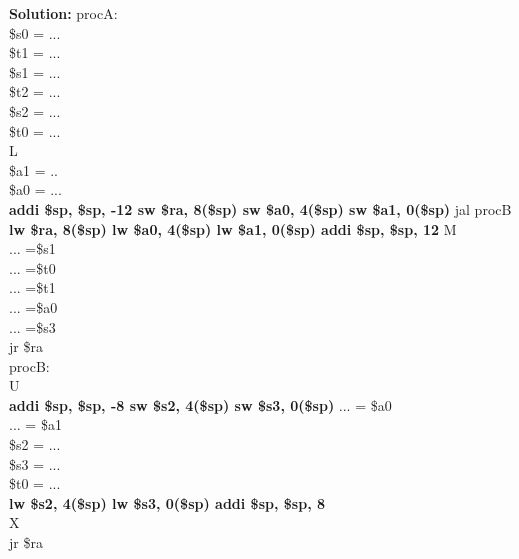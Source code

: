 \documentclass[11pt]{article}
\begin{document}
\textbf{Solution:} procA: \\
    \$s0 = ... \\
    \$t1 = ... \\
    \$s1 = ... \\
    \$t2 = ... \\
    \$s2 = ... \\
    \$t0 = ... \\
    L \\
    \$a1 = .. \\
    \$a0 = ... \\   
    \textbf{
    addi \$sp, \$sp, -12 \newline
    sw \$ra, 8(\$sp) \newline 
    sw \$a0, 4(\$sp) \newline 
    sw \$a1, 0(\$sp) \newline
    }
    jal procB \newline 
    \textbf{
    lw \$ra, 8(\$sp) \newline
    lw \$a0, 4(\$sp)\newline
    lw \$a1, 0(\$sp)\newline
    addi \$sp, \$sp, 12\newline
    }
    M \\
    ... =\$s1 \\
    ... =\$t0 \\
    ... =\$t1 \\
    ... =\$a0 \\
    ... =\$s3 \\
     jr \$ra \\
     \newline 
     procB: \\ 
    U \\
    \textbf{
    addi \$sp, \$sp, -8 \newline
    sw \$s2, 4(\$sp)\newline
    sw \$s3, 0(\$sp)\newline
    }
    ... = \$a0 \\
    ... = \$a1 \\
    \$s2 = ...\\
    \$s3 = ...\\
    \$t0 = ...\\
    \textbf{
    lw \$s2, 4(\$sp)\newline
    lw \$s3, 0(\$sp)\newline
    addi \$sp, \$sp, 8\newline
    }\\
    X\\
    jr \$ra
\end{document}
